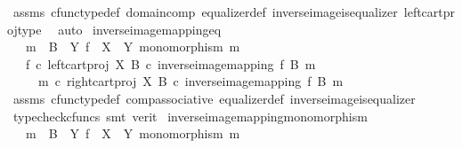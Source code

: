 \begin{isabellebody}
\ assms\ cfunc{\isacharunderscore}{\kern0pt}type{\isacharunderscore}{\kern0pt}def\ domain{\isacharunderscore}{\kern0pt}comp\ equalizer{\isacharunderscore}{\kern0pt}def\ inverse{\isacharunderscore}{\kern0pt}image{\isacharunderscore}{\kern0pt}is{\isacharunderscore}{\kern0pt}equalizer{}\ left{\isacharunderscore}{\kern0pt}cart{\isacharunderscore}{\kern0pt}proj{\isacharunderscore}{\kern0pt}type\ \isamarkupfalse%
\ auto%
\endisatagproof
{\isafoldproof}%
%
\isadelimproof
\isanewline
%
\endisadelimproof
\isanewline
{}\isamarkupfalse%
\ inverse{\isacharunderscore}{\kern0pt}image{\isacharunderscore}{\kern0pt}mapping{\isacharunderscore}{\kern0pt}eq{\isacharcolon}{\kern0pt}\isanewline
\ \ \ {\isachardoublequoteopen}m\ {\isacharcolon}{\kern0pt}\ B\ {\isasymrightarrow}\ Y{\isachardoublequoteclose}\ {\isachardoublequoteopen}f\ {\isacharcolon}{\kern0pt}\ X\ {\isasymrightarrow}\ Y{\isachardoublequoteclose}\ {\isachardoublequoteopen}monomorphism\ m{\isachardoublequoteclose}\isanewline
\ \ \ {\isachardoublequoteopen}f\ {\isasymcirc}\isactrlsub c\ left{\isacharunderscore}{\kern0pt}cart{\isacharunderscore}{\kern0pt}proj\ X\ B\ {\isasymcirc}\isactrlsub c\ inverse{\isacharunderscore}{\kern0pt}image{\isacharunderscore}{\kern0pt}mapping\ f\ B\ m\isanewline
\ \ \ \ {\isacharequal}{\kern0pt}\ m\ {\isasymcirc}\isactrlsub c\ right{\isacharunderscore}{\kern0pt}cart{\isacharunderscore}{\kern0pt}proj\ X\ B\ {\isasymcirc}\isactrlsub c\ inverse{\isacharunderscore}{\kern0pt}image{\isacharunderscore}{\kern0pt}mapping\ f\ B\ m{\isachardoublequoteclose}\isanewline
%
\isadelimproof
\ \ %
\endisadelimproof
%
\isatagproof
{}\isamarkupfalse%
\ assms\ cfunc{\isacharunderscore}{\kern0pt}type{\isacharunderscore}{\kern0pt}def\ comp{\isacharunderscore}{\kern0pt}associative\ equalizer{\isacharunderscore}{\kern0pt}def\ inverse{\isacharunderscore}{\kern0pt}image{\isacharunderscore}{\kern0pt}is{\isacharunderscore}{\kern0pt}equalizer{}\isanewline
\ \ \isamarkupfalse%
\ {\isacharparenleft}{\kern0pt}typecheck{\isacharunderscore}{\kern0pt}cfuncs{\isacharcomma}{\kern0pt}\ smt\ {\isacharparenleft}{\kern0pt}verit{\isacharparenright}{\kern0pt}{\isacharparenright}{\kern0pt}%
\endisatagproof
{\isafoldproof}%
%
\isadelimproof
\isanewline
%
\endisadelimproof
\isanewline
{}\isamarkupfalse%
\ inverse{\isacharunderscore}{\kern0pt}image{\isacharunderscore}{\kern0pt}mapping{\isacharunderscore}{\kern0pt}monomorphism{\isacharcolon}{\kern0pt}\isanewline
\ \ \ {\isachardoublequoteopen}m\ {\isacharcolon}{\kern0pt}\ B\ {\isasymrightarrow}\ Y{\isachardoublequoteclose}\ {\isachardoublequoteopen}f\ {\isacharcolon}{\kern0pt}\ X\ {\isasymrightarrow}\ Y{\isachardoublequoteclose}\ {\isachardoublequoteopen}monomorphism\ m{\isachardoublequoteclose}\isanewline

\end{isabellebody}
